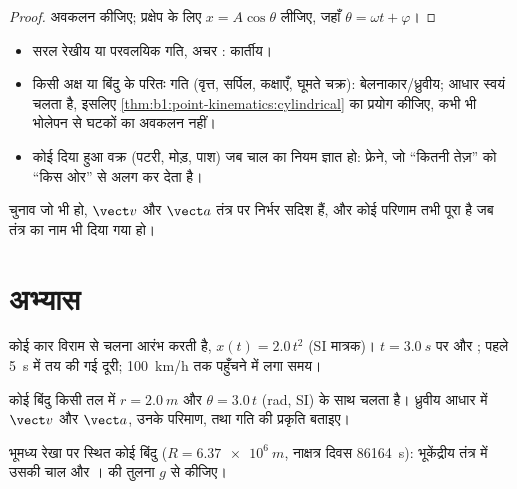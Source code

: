 \begin{proof}
अवकलन कीजिए; प्रक्षेप के लिए $x = A\cos\theta$ लीजिए, जहाँ $\theta =
\omega t + \varphi$।
\end{proof}

\begin{method}[निर्देशांकों का चुनाव]\label{met:b1:point-kinematics:choose}
\begin{itemize}
  \item सरल रेखीय या परवलयिक गति, अचर : कार्तीय।
  \item किसी अक्ष या बिंदु के परितः गति (वृत्त, सर्पिल, कक्षाएँ, घूमते
        चक्र): बेलनाकार/ध्रुवीय; आधार स्वयं चलता है, इसलिए
        \cref{thm:b1:point-kinematics:cylindrical} का प्रयोग कीजिए, कभी भी
        भोलेपन से घटकों का अवकलन नहीं।
  \item कोई दिया हुआ वक्र (पटरी, मोड़, पाश) जब चाल का नियम ज्ञात हो: फ्रेने,
        जो ``कितनी तेज़'' को ``किस ओर'' से अलग कर देता है।
\end{itemize}
चुनाव जो भी हो, $\vect v$ और $\vect a$ तंत्र पर निर्भर सदिश हैं, और कोई
परिणाम तभी पूरा है जब तंत्र का नाम भी दिया गया हो।
\end{method}

\section{अभ्यास}

\begin{exercise}[$\star$]\label{exo:b1:point-kinematics:1}
कोई कार विराम से चलना आरंभ करती है, $x(t) = 2.0\,t^2$ (SI मात्रक)।
$t = \qty{3.0}{s}$ पर  और ; पहले \qty{5}{s} में तय की गई दूरी;
\qty{100}{km/h} तक पहुँचने में लगा समय।
\end{exercise}

\begin{exercise}[$\star$]\label{exo:b1:point-kinematics:2}
कोई बिंदु किसी तल में $r = \qty{2.0}{m}$ और $\theta = 3.0\,t$ (rad, SI) के
साथ चलता है। ध्रुवीय आधार में $\vect v$ और $\vect a$, उनके परिमाण, तथा गति
की प्रकृति बताइए।
\end{exercise}

\begin{exercise}[$\star$]\label{exo:b1:point-kinematics:3}
भूमध्य रेखा पर स्थित कोई बिंदु ($R = \qty{6.37e6}{m}$, नाक्षत्र दिवस
\qty{86164}{s}): भूकेंद्रीय तंत्र में उसकी चाल और ।  की तुलना $g$
से कीजिए।
\end{exercise}

